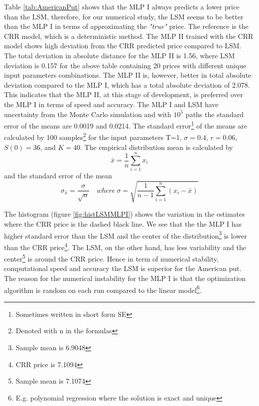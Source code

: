 Table \ref{tab:AmericanPut} shows that the MLP I always predicts a lower price than the LSM, therefore, for our numerical study, the LSM seems to be better than the MLP I in terms of approximating the \textsl{"true"} price. The reference is the CRR model, which is a deterministic method. The MLP II trained with the CRR model shows high deviation from the CRR predicted price compared to LSM. The total deviation in absolute distance for the MLP II is 1.56, where LSM deviation is 0.157 for the above table containing 20 prices with different unique input parameters combinations. The MLP II is, however, better in total absolute deviation compared to the MLP I, which has a total absolute deviation of 2.078. This indicates that the MLP II, at this stage of development, is preferred over the MLP I in terms of speed and accuracy. The MLP I and LSM have uncertainty from the Monte Carlo simulation and with $10^5$ paths the standard error of the means are 0.0019 and 0.0214. The standard error\footnote{Sometimes written in short form SE} of the means are calculated by 100 samples\footnote{Denoted with n in the formulas} for the input parameters T=1, $\sigma=0.4$, $r=0.06$, $S(0)=36$, and $K=40$. The empirical distribution mean is calculated by
$$\bar{x}= \frac{1}{n}\sum_{i=1}^{n} x_i$$
and the standard error of the mean
$$\sigma_{\bar{x}}= \frac{\sigma}{\sqrt{n}} \quad where \ \sigma=\sqrt{\frac{1}{n-1}\sum_{i=1}^{n} (x_i-\bar{x})}$$
 
The histogram (figure \ref{fig:histLSMMLPI}) shows the variation in the estimates where the CRR price is the dashed black line. We see that the the MLP I has higher standard error than the LSM and the center of the distribution\footnote{Sample mean is 6.9048} is lower than the CRR price\footnote{CRR price is 7.1094}. The LSM, on the other hand, has less variability and the center\footnote{Sample mean is 7.1074} is around the CRR price. Hence in term of numerical stability, computational speed and accuracy the LSM is superior for the American put. The reason for the numerical instability for the MLP I is that the optimization algorithm is random on each run compared to the linear model\footnote{E.g. polynomial regression where the solution is exact and unique}.\\

